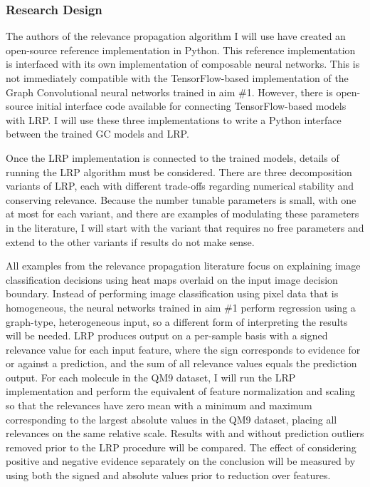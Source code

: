 \documentclass[12pt]{article}
\begin{document}
\subsubsection{Research Design}
\label{sec:org3e9a7c4}

The authors of the relevance propagation algorithm I will use have created an open-source reference implementation in Python. This reference implementation is interfaced with its own implementation of composable neural networks. This is not immediately compatible with the TensorFlow-based implementation of the Graph Convolutional neural networks trained in aim \#1. However, there is open-source initial interface code available for connecting TensorFlow-based models with LRP\cite{github:lrp_tf,github:lrp_tf2}. I will use these three implementations to write a Python interface between the trained GC models and LRP.

Once the LRP implementation is connected to the trained models, details of running the LRP algorithm must be considered. There are three decomposition variants of LRP, each with different trade-offs regarding numerical stability and conserving relevance\cite{Binder2016}. Because the number tunable parameters is small, with one at most for each variant, and there are examples of modulating these parameters in the literature, I will start with the variant that requires no free parameters and extend to the other variants if results do not make sense.

All examples from the relevance propagation literature focus on explaining image classification decisions using heat maps overlaid on the input image decision boundary. Instead of performing image classification using pixel data that is homogeneous, the neural networks trained in aim \#1 perform regression using a graph-type, heterogeneous input, so a different form of interpreting the results will be needed. LRP produces output on a per-sample basis with a signed relevance value for each input feature, where the sign corresponds to evidence for or against a prediction, and the sum of all relevance values equals the prediction output. For each molecule in the QM9 dataset, I will run the LRP implementation and perform the equivalent of feature normalization and scaling so that the relevances have zero mean with a minimum and maximum corresponding to the largest absolute values in the QM9 dataset, placing all relevances on the same relative scale. Results with and without prediction outliers removed prior to the LRP procedure will be compared. The effect of considering positive and negative evidence separately on the conclusion will be measured by using both the signed and absolute values prior to reduction over features.
\end{document}
